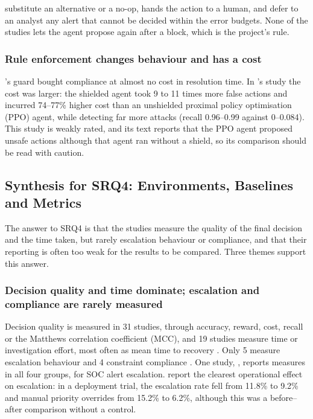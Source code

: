 \documentclass[pdflatex,sn-basic]{sn-jnl}
\begin{document}
\citet{ravi2025} substitute an alternative or a no-op, \citet{singh2026} hands the action to a human, and \citet{sahin2026} defer to an analyst any alert that cannot be decided within the error budgets. None of the studies lets the agent propose again after a block, which is the project's rule.

\subsubsection{Rule enforcement changes behaviour and has a cost}

\citeauthor{singh2026}'s \citeyearpar{singh2026} guard bought compliance at almost no cost in resolution time. In \citeauthor{ravi2025}'s \citeyearpar{ravi2025} study the cost was larger: the shielded agent took 9 to 11 times more false actions and incurred 74--77\% higher cost than an unshielded proximal policy optimisation (PPO) agent, while detecting far more attacks (recall 0.96--0.99 against 0--0.084). This study is weakly rated, and its text reports that the PPO agent proposed unsafe actions although that agent ran without a shield, so its comparison should be read with caution.

\subsection{Synthesis for SRQ4: Environments, Baselines and Metrics}

The answer to SRQ4 is that the studies measure the quality of the final decision and the time taken, but rarely escalation behaviour or compliance, and that their reporting is often too weak for the results to be compared. Three themes support this answer.

\subsubsection{Decision quality and time dominate; escalation and compliance are rarely measured}

Decision quality is measured in 31 studies, through accuracy, reward, cost, recall or the Matthews correlation coefficient (MCC), and 19 studies measure time or investigation effort, most often as mean time to recovery \citep{singh2026,koupaei2026,nimmathi2026,aenugu2026}. Only 5 measure escalation behaviour \citep{peralta2025,sahin2026,nimmathi2026,bhosale2026,kovtun2026} and 4 constraint compliance \citep{singh2026,sahin2026,kovtun2026,ravi2025}. One study, \citet{kovtun2026}, reports measures in all four groups, for SOC alert escalation. \citet{peralta2025} report the clearest operational effect on escalation: in a deployment trial, the escalation rate fell from 11.8\% to 9.2\% and manual priority overrides from 15.2\% to 6.2\%, although this was a before--after comparison without a control.
\end{document}

